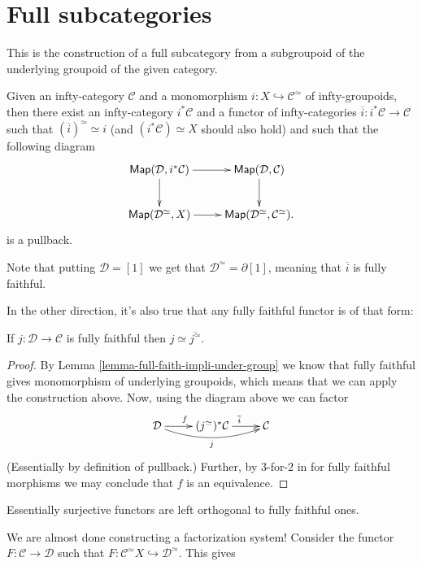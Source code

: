 \section{Full subcategories}
\label{section-full-subcactegories}

\noindent
This is the construction of a full
subcategory
from a subgroupoid of the underlying groupoid
of the given category.

Given an infty-category $\mathcal{C}$
and a monomorphism $i:X \hookrightarrow
\mathcal{C}^\simeq$ of infty-groupoids,
then there exist an infty-category
$i^*\mathcal{C}$
and a functor of infty-categories
$\overline{i}:i^*\mathcal{C} \to \mathcal{C}$
such that $(\overline{i})^\simeq \simeq i$
(and $(i^*\mathcal{C})\simeq X$ should also
hold)
and such that the following diagram
$$
\xymatrix{
\mathsf{Map}(\mathcal{D},i^*\mathcal{C})
\ar[r]\ar[d]&
\mathsf{Map}(\mathcal{D},\mathcal{C})\ar[d]\\
\mathsf{Map}(\mathcal{D}^\simeq,X)\ar[r]&
\mathsf{Map}(\mathcal{D}^\simeq,\mathcal{C}
^\simeq).
}
$$
is a pullback.

Note that putting $\mathcal{D}=[1]$
we get that $\mathcal{D}^\simeq=\partial[1]$,
meaning that $\overline{i}$ is fully
faithful.

In the other direction, it's also true that
any fully faithful
functor is of that form:

\begin{lemma}
\label{lemma-fully-faithful-subcategories}
If $j:\mathcal{D} \to \mathcal{C}$ is fully
faithful
then $j \simeq \overline{j^\simeq}$.
\end{lemma}

\begin{proof}
By Lemma
\ref{lemma-full-faith-impli-under-group}
we know that fully faithful gives
monomorphism of underlying groupoids,
which means that we can apply the
construction above.
Now, using the diagram above we can factor
$$
\xymatrix{
\mathcal{D}\ar[r]^f\ar@/_1em/[rr]_j
&(j^\simeq)^*\mathcal{C}
\ar[r]^{\overline{i}}
&\mathcal{C}
}
$$
(Essentially by definition of pullback.)
Further, by 3-for-2 in for fully faithful
morphisms we may
conclude that $f$ is an equivalence.
\end{proof}

\begin{lemma}
\label{lemma-essen-surje-ortho}
Essentially surjective functors are left
orthogonal to fully faithful ones.
\end{lemma}

\medskip\noindent
We are almost done constructing a
factorization system!
Consider the functor  $F:\mathcal{C} \to
\mathcal{D}$ such that
$F:\mathcal{C}^\simeq X \hookrightarrow
\mathcal{D}^\simeq.$
This gives

